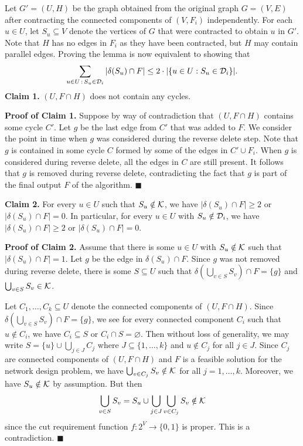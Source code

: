 \begin{pf}
    Let $G' = (U, H)$ be the graph obtained from the original graph 
    $G = (V, E)$ after contracting the connected components of $(V, F_i)$ 
    independently. For each $u \in U$, let $S_u \subseteq V$ denote the 
    vertices of $G$ that were contracted to obtain $u$ in $G'$. 
    Note that $H$ has no edges in $F_i$ as they have been contracted, 
    but $H$ may contain parallel edges. Proving the lemma is now equivalent 
    to showing that 
    \[ \sum_{u\in U\,:\,S_u \in {\cal D}_i} |\delta(S_u) \cap F| \leq 
    2 \cdot |\{u\in U : S_u \in {\cal D}_i\}|. \] 
    {\bf Claim 1.} $(U, F \cap H)$ does not contain any cycles. 

    {\bf Proof of Claim 1.} Suppose by way of contradiction that 
    $(U, F \cap H)$ contains some cycle $C'$. Let $g$ be the last 
    edge from $C'$ that was added to $F$. We consider the point 
    in time when $g$ was considered during the reverse delete step. 
    Note that $g$ is contained in some cycle $C$ formed by some 
    of the edges in $C' \cup F_i$. When $g$ is considered during 
    reverse delete, all the edges in $C$ are still present. 
    It follows that $g$ is removed during reverse delete, contradicting 
    the fact that $g$ is part of the final output $F$ of the algorithm. 
    \hfill $\blacksquare$

    {\bf Claim 2.} For every $u \in U$ such that $S_u \notin {\cal K}$, 
    we have $|\delta(S_u) \cap F| \geq 2$ or $|\delta(S_u) \cap F| = 0$. 
    In particular, for every $u \in U$ with $S_u \notin {\cal D}_i$,
    we have $|\delta(S_u) \cap F| \geq 2$ or $|\delta(S_u) \cap F| = 0$.

    {\bf Proof of Claim 2.} Assume that there is some $u \in U$ 
    with $S_u \notin {\cal K}$ such that $|\delta(S_u) \cap F| = 1$. 
    Let $g$ be the edge in $\delta(S_u) \cap F$. Since $g$ was not 
    removed during reverse delete, there is some $S \subseteq U$ 
    such that $\delta(\bigcup_{v\in S} S_v) \cap F = \{g\}$ 
    and $\bigcup_{v\in S} S_v \in {\cal K}$. 
    
    Let $C_1, \dots, C_k \subseteq U$ denote the connected components 
    of $(U, F \cap H)$. Since $\delta(\bigcup_{v\in S} S_v) \cap F = \{g\}$, 
    we see for every connected component $C_i$ such that 
    $u \notin C_i$, we have $C_i \subseteq S$ or $C_i \cap S = \varnothing$. 
    Then without loss of generality, we may write 
    $S = \{u\} \cup \bigcup_{j \in J} C_j$
    where $J \subseteq \{1, \dots, k\}$ and $u \notin C_j$ for all $j \in J$. 
    Since $C_j$ are connected components of $(U, F \cap H)$ and 
    $F$ is a feasible solution for the network design problem, we have 
    $\bigcup_{v \in C_j} S_v \notin {\cal K}$ for all $j = 1, \dots, k$. 
    Moreover, we have $S_u \notin {\cal K}$ by assumption. But then 
    \[ \bigcup_{v \in S} S_v = S_u \cup \bigcup_{j \in J} \bigcup_{v \in C_j} S_v \notin {\cal K} \] 
    since the cut requirement function $f : 2^V \to \{0, 1\}$ is proper. 
    This is a contradiction. \hfill $\blacksquare$
    

\end{pf}
